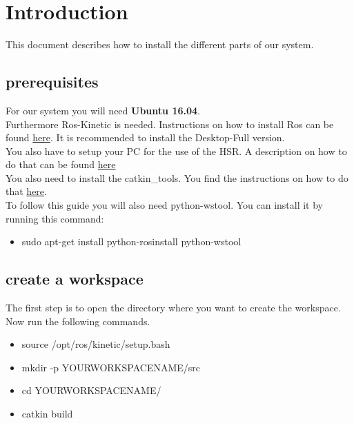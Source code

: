 \documentclass[main.tex]{subfiles}
\begin{document}
\newpage
	\section{Introduction}
	This document describes how to install the different parts of our system.
	
	\subsection{prerequisites}
	
	For our system you will need \textbf{Ubuntu 16.04}.\\
	Furthermore Ros-Kinetic is needed. Instructions on how to install Ros can be found \href{http://wiki.ros.org/kinetic/Installation/Ubuntu}{here}. It is recommended to install the Desktop-Full version.\\
	You also have to setup your PC for the use of the HSR.
	A description on how to do that can be found \href{https://docs.hsr.io/manual_en/howto/pc_install.html}{here}\\
	You also need to install the catkin\_tools. You find the instructions on how to do that \href{https://catkin-tools.readthedocs.io/en/latest/installing.html}{here}.\\
	To follow this guide you will also need python-wstool.
	You can install it by running this command:
	\begin{itemize}
	\item sudo apt-get install python-rosinstall python-wstool
	\end{itemize}
	
	
	\subsection{create a workspace}
	The first step is to open the directory where you want to create the workspace.\\
	Now run the following commands.
	\begin{itemize}
	\item source /opt/ros/kinetic/setup.bash
	\item mkdir -p YOURWORKSPACENAME/src
	\item cd YOURWORKSPACENAME/
	\item catkin build 
	\end{itemize}
	
\end{document}
